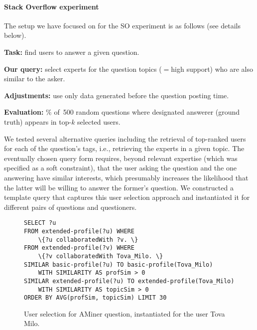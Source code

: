 \paragraph*{Stack Overflow experiment}
\label{SO} The setup we have focused on for the SO experiment is as follows (see details below).
\begin{compactitem}
\item \textbf{Task:} find users to answer a given question.
\item \textbf{Our query:} select experts for the question topics ($=$high support) who are also similar to the asker.
\item \textbf{Adjustments:} use only data generated before the question posting time.
\item \textbf{Evaluation:} \% of~500 random questions where designated answerer (ground truth) appears in top-$k$ selected users.
\end{compactitem}
We tested several alternative \qlang{} queries including the retrieval of top-ranked users for each of the
question's tags, i.e., retrieving the experts in a given topic. The eventually chosen query form requires, beyond relevant expertise (which was specified as a soft constraint), that the user asking the question and the one
answering have similar interests, which presumably increases the likelihood that the latter will be willing to answer the former's question. %
We constructed a template \qlang{} query that captures this user selection approach
and instantiated it for different pairs of questions and
questioners. 

\begin{figure}
	{\scriptsize
		\begin{Verbatim}
SELECT ?u
FROM extended-profile(?u) WHERE
	\{?u collaboratedWith ?v. \}
FROM extended-profile(?v) WHERE
	\{?v collaboratedWith Tova_Milo. \}
SIMILAR basic-profile(?u) TO basic-profile(Tova_Milo)
	WITH SIMILARITY AS profSim > 0
SIMILAR extended-profile(?u) TO extended-profile(Tova_Milo)
	WITH SIMILARITY AS topicSim > 0
ORDER BY AVG(profSim, topicSim) LIMIT 30
		\end{Verbatim}
	} \vspace{-6mm} \caption{User selection for AMiner
	question, instantiated for the user Tova Milo.} \label{fig:AminerQuery}
\end{figure}

